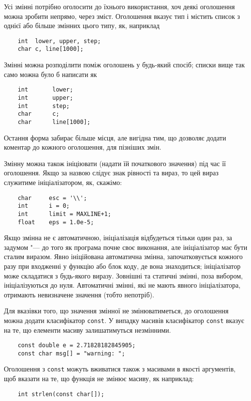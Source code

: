 \documentclass[a4paper,12pt]{book}
\begin{document}
  Усі змінні потрібно оголосити до їхнього використання, хоч деякі оголошення можна
  зробити непрямо, через зміст. Оголошення вказує тип і містить список з однієї або більше
  змінних цього типу, як, наприклад
  \begin{verbatim}
    int  lower, upper, step;
    char c, line[1000];
  \end{verbatim}

  Змінні можна розподілити поміж оголошень у будь-який спосіб; списки вище так само можна
  було б написати як
  \begin{verbatim}
    int       lower;
    int       upper;
    int       step;
    char      c;
    char      line[1000];
  \end{verbatim}

  Остання форма забирає більше місця, але вигідна тим, що дозволяє додати коментар до
  кожного оголошення, для пізніших змін.

  Змінну можна також ініціювати (надати їй початкового значення) під час її оголошення.
  Якщо за назвою слідує знак рівності та вираз, то цей вираз служитиме ініціалізатором, як,
  скажімо:
  \begin{verbatim}
    char     esc = '\\';
    int      i = 0;
    int      limit = MAXLINE+1;
    float    eps = 1.0e-5;
  \end{verbatim}

  Якщо змінна не є автоматичною, ініціалізація відбудеться тільки один раз, за задумом
  "--- до того як програма почне своє виконання, але ініціалізатор має бути сталим
  виразом. Явно ініційована автоматична змінна, започатковується кожного разу при
  входженні у функцію або блок коду, де вона знаходиться; ініціалізатор може складатися з
  будь-якого виразу. Зовнішні та статичні змінні, поза вибором, ініціалізуються до нуля.
  Автоматичні змінні, які не мають явного ініціалізатора, отримають невизначене значення
  (тобто непотріб).

  Для вказівки того, що значення змінної не змінюватиметься, до оголошення можна додати
  класифікатор \texttt{const}. У випадку масивів класифікатор \texttt{const} вказує на
  те, що елементи масиву залишатимуться незмінними.
  \begin{verbatim}
    const double e = 2.71828182845905;
    const char msg[] = "warning: ";
  \end{verbatim}

  Оголошення з \texttt{const} можуть вживатися також з масивами в якості аргументів, щоб
  вказати на те, що функція не змінює масиву, як наприклад:
  \begin{verbatim}
    int strlen(const char[]);
  \end{verbatim}
\end{document}
